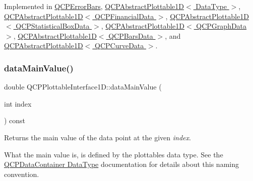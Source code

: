 Implemented in \hyperlink{class_q_c_p_error_bars_ae3931213f76cd34a824c42c22a1dca74}{Q\+C\+P\+Error\+Bars}, \hyperlink{class_q_c_p_abstract_plottable1_d_ab14ab428595856bf76e04499017fa8dc}{Q\+C\+P\+Abstract\+Plottable1\+D$<$ Data\+Type $>$}, \hyperlink{class_q_c_p_abstract_plottable1_d_ab14ab428595856bf76e04499017fa8dc}{Q\+C\+P\+Abstract\+Plottable1\+D$<$ Q\+C\+P\+Financial\+Data $>$}, \hyperlink{class_q_c_p_abstract_plottable1_d_ab14ab428595856bf76e04499017fa8dc}{Q\+C\+P\+Abstract\+Plottable1\+D$<$ Q\+C\+P\+Statistical\+Box\+Data $>$}, \hyperlink{class_q_c_p_abstract_plottable1_d_ab14ab428595856bf76e04499017fa8dc}{Q\+C\+P\+Abstract\+Plottable1\+D$<$ Q\+C\+P\+Graph\+Data $>$}, \hyperlink{class_q_c_p_abstract_plottable1_d_ab14ab428595856bf76e04499017fa8dc}{Q\+C\+P\+Abstract\+Plottable1\+D$<$ Q\+C\+P\+Bars\+Data $>$}, and \hyperlink{class_q_c_p_abstract_plottable1_d_ab14ab428595856bf76e04499017fa8dc}{Q\+C\+P\+Abstract\+Plottable1\+D$<$ Q\+C\+P\+Curve\+Data $>$}.

\mbox{\label{class_q_c_p_plottable_interface1_d_af6330919e8023277d08c958a6074fc76}} 
\subsubsection{\texorpdfstring{data\+Main\+Value()}{dataMainValue()}}
{\footnotesize\ttfamily double Q\+C\+P\+Plottable\+Interface1\+D\+::data\+Main\+Value (\begin{DoxyParamCaption}\item[{int}]{index }\end{DoxyParamCaption}) const\hspace{0.3cm}{\ttfamily [pure virtual]}}

Returns the main value of the data point at the given {\itshape index}.

What the main value is, is defined by the plottable\textquotesingle{}s data type. See the \hyperlink{class_q_c_p_data_container_qcpdatacontainer-datatype}{Q\+C\+P\+Data\+Container Data\+Type} documentation for details about this naming convention. 

